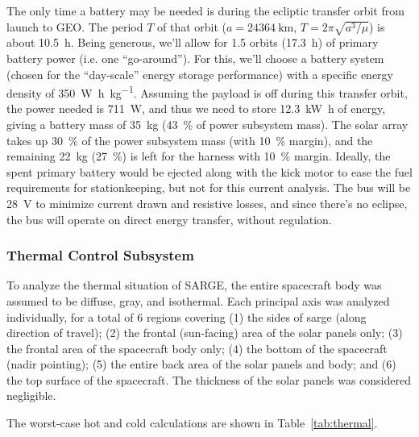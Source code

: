 \documentclass[9pt]{article}
\begin{document}
The only time a battery may be needed is during the ecliptic transfer orbit from launch to GEO.
The period $T$ of that orbit ($a=\qty{24364}{\kilo\meter}$, $T=2\pi\sqrt{a^3/\mu}$) is about \qty{10.5}{\hour}.
Being generous, we'll allow for 1.5 orbits (\qty{17.3}{\hour}) of primary battery power (i.e. one ``go-around'').
For this, we'll choose a  battery system (chosen for the ``day-scale'' energy storage performance) with a specific energy density of \qty{350}{\watt\hour\per\kilo\gram}.
Assuming the payload is off during this transfer orbit, the power needed is \qty{711}{\watt}, and thus we need to store \qty{12.3}{\kilo\watt\hour} of energy, giving a battery mass of \qty{35}{\kilo\gram} (\qty{43}{\percent} of power subsystem mass).
The solar array takes up \qty{30}{\percent} of the power subsystem mass (with \qty{10}{\percent} margin), and the remaining \qty{22}{\kilo\gram} (\qty{27}{\percent}) is left for the harness with \qty{10}{\percent} margin.
Ideally, the spent primary battery would be ejected along with the kick motor to ease the fuel requirements for stationkeeping, but not for this current analysis.
The bus will be \qty{28}{\volt} to minimize current drawn and resistive losses, and since there's no eclipse, the bus will operate on direct energy transfer, without regulation.


\subsubsection{Thermal Control Subsystem}\label{sys:thermal}
To analyze the thermal situation of SARGE, the entire spacecraft body was assumed to be diffuse, gray, and isothermal.
Each principal axis was analyzed individually, for a total of 6 regions covering (1) the sides of sarge (along direction of travel); (2) the frontal (sun-facing) area of the solar panels only; (3) the frontal area of the spacecraft body only; (4) the bottom of the spacecraft (nadir pointing); (5) the entire back area of the solar panels and body; and (6) the top surface of the spacecraft.
The thickness of the solar panels was considered negligible.

The worst-case hot and cold calculations are shown in Table~\ref{tab:thermal}.
\end{document}
